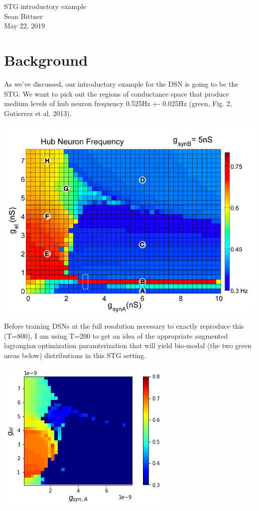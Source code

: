 \documentclass[11pt]{article}
\begin{document}
\medskip                        %

\thispagestyle{plain}
\begin{center}                  %
{\Large STG introductory example} \\
Sean Bittner \\
May 22, 2019 \\
\end{center}

\section{Background}
As we've discussed, our introductory example for the DSN is going to be the STG.  We want to pick out the regions of conductance space that produce medium levels of hub neuron frequency 0.525Hz +- 0.025Hz (green, Fig. 2, Gutierrez et al. 2013). \\
\begin{center}
\includegraphics[scale=0.3]{figs/Gutierrez2013_Fig2.png}
\end{center}
Before training DSNs at the full resolution necessary to exactly reproduce this (T=800), I am using T=200 to get an idea of the appropriate augmented lagrangian optimization paramterization that will yield bio-modal (the two green areas below) distributions in this STG setting.
\begin{center}
\includegraphics[scale=0.8]{DSN_figs/STG_T=200.png}
\end{center}
\end{document}
